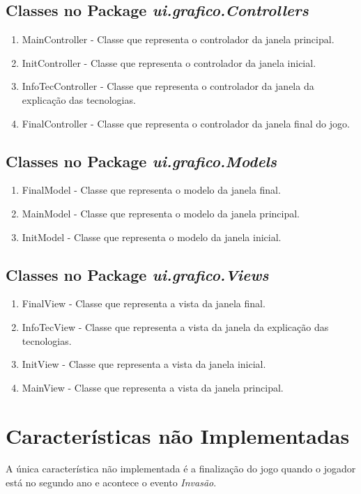 \documentclass[12pt,a4paper]{article}
\begin{document}
\subsection{Classes no Package \textit{ui.grafico.Controllers}}
\begin{enumerate}
\item MainController - Classe que representa o controlador da janela principal.
\item InitController - Classe que representa o controlador da janela inicial.
\item InfoTecController - Classe que representa o controlador da janela da explicação das tecnologias.
\item FinalController - Classe que representa o controlador da janela final do jogo.
\end{enumerate}
\newpage\noindent
    
\subsection{Classes no Package \textit{ui.grafico.Models}}
\begin{enumerate}
\item FinalModel - Classe que representa o modelo da janela final.
\item MainModel - Classe que representa o modelo da janela principal.
\item InitModel - Classe que representa o modelo da janela inicial.
\end{enumerate}
\newpage\noindent
    
\subsection{Classes no Package \textit{ui.grafico.Views}}
\begin{enumerate}
\item FinalView - Classe que representa a vista da janela final.
\item InfoTecView - Classe que representa a vista da janela da explicação das tecnologias.
\item InitView - Classe que representa a vista da janela inicial.
\item MainView - Classe que representa a vista da janela principal.
\end{enumerate}

\newpage\noindent

\section{Características não Implementadas}
\-\hspace{1cm}A única característica não implementada é a finalização do jogo quando o jogador está no segundo ano e acontece o evento \textit{Invasão}.
\end{document}

